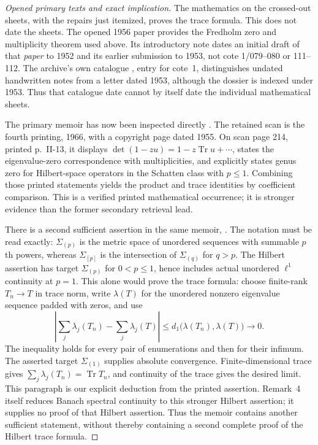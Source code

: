 \begin{proof}[Opened primary texts and exact implication]
The mathematics on the crossed-out sheets, with the repairs just itemized,
proves the trace formula. This does not date the sheets. The opened 1956
paper provides the Fredholm zero and multiplicity theorem used above. Its
introductory note dates an initial draft of that \emph{paper} to 1952 and
its earlier submission to 1953, not cote 1/079--080 or 111--112.
The archive's own catalogue \cite{geoMontpellierCatalogue}, entry for
cote~1, distinguishes undated handwritten notes from a letter dated 1953,
although the dossier is indexed under 1953. Thus that catalogue date
cannot by itself date the individual mathematical sheets.

The primary memoir has now been inspected directly
\cite[Chapter II, \S1, no.~4, printed p.~13]{Grothendieck1955Memoir}.
The retained scan is the fourth printing, 1966, with a copyright page dated
1955. On scan page 214, printed p.~II-13, it displays
$\det(1-zu)=1-z\operatorname{Tr}u+\cdots$, states the eigenvalue-zero
correspondence with multiplicities, and explicitly states genus zero for
Hilbert-space operators in the Schatten class with $p\leq1$. Combining
those printed statements yields the product and trace identities by
coefficient comparison. This is a verified printed mathematical occurrence;
it is stronger evidence than the former secondary retrieval lead.

There is a second sufficient assertion in the same memoir,
\cite[Chapter II, \S1, no.~4, Remark 4, pp.~20--22, especially p.~21]{Grothendieck1955Memoir}.
The notation must be read exactly: $\Sigma_{(p)}$ is the metric space of
unordered sequences with summable $p$th powers, whereas $\Sigma_{[p]}$
is the intersection of $\Sigma_{(q)}$ for $q>p$. The Hilbert assertion has
target $\Sigma_{(p)}$ for $0<p\leq1$, hence includes actual unordered
$\ell^1$ continuity at $p=1$. This alone would prove the trace formula:
choose finite-rank $T_n\to T$ in trace norm, write $\lambda(T)$ for the
unordered nonzero eigenvalue sequence padded with zeros, and use
\[
 \left|\sum_j\lambda_j(T_n)-\sum_j\lambda_j(T)\right|
 \leq d_1\bigl(\lambda(T_n),\lambda(T)\bigr)\longrightarrow0.
\]
The inequality holds for every pair of enumerations and then for their
infimum. The asserted target $\Sigma_{(1)}$ supplies absolute convergence.
Finite-dimensional trace gives $\sum_j\lambda_j(T_n)=\operatorname{Tr}T_n$,
and continuity of the trace gives the desired limit. This paragraph is
our explicit deduction from the printed assertion. Remark~4 itself
reduces Banach spectral continuity to this stronger Hilbert assertion;
it supplies no proof of that Hilbert assertion. Thus the memoir contains
another sufficient statement, without thereby containing a second
complete proof of the Hilbert trace formula.


\end{proof}
